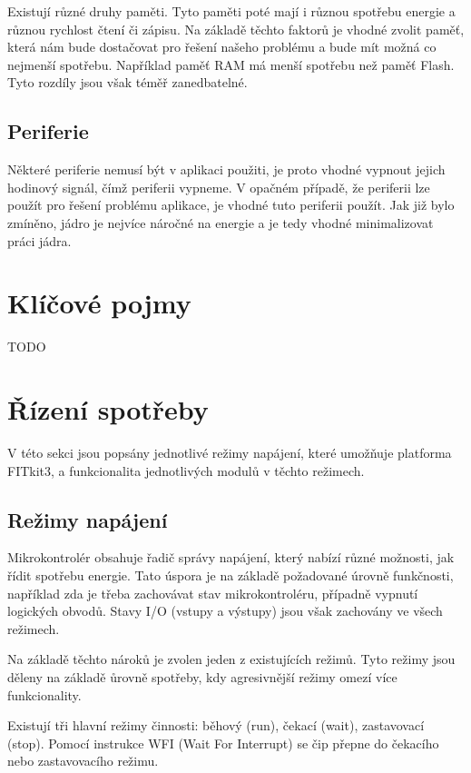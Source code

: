 \documentclass{article}
\begin{document}
Existují různé druhy paměti. Tyto paměti poté mají i různou spotřebu energie a
různou rychlost čtení či zápisu. Na základě těchto faktorů je vhodné zvolit
paměť, která nám bude dostačovat pro řešení našeho problému a bude mít možná co
nejmenší spotřebu. Například paměť RAM má menší spotřebu než paměť Flash. Tyto
rozdíly jsou však téměř zanedbatelné.

\subsection*{Periferie}

Některé periferie nemusí být v aplikaci použiti, je proto vhodné vypnout jejich
hodinový signál, čímž periferii vypneme. V opačném případě, že periferii lze
použít pro řešení problému aplikace, je vhodné tuto periferii použít. Jak již
bylo zmíněno, jádro je nejvíce náročné na energie a je tedy vhodné
minimalizovat práci jádra.

\section{Klíčové pojmy}

TODO

\section{Řízení spotřeby}

V této sekci jsou popsány jednotlivé režimy napájení, které umožňuje platforma
FITkit3, a funkcionalita jednotlivých modulů v těchto režimech.

\subsection{Režimy napájení}

Mikrokontrolér obsahuje řadič správy napájení, který nabízí různé možnosti, jak
řídit spotřebu energie. Tato úspora je na základě požadované úrovně funkčnosti,
například zda je třeba zachovávat stav mikrokontroléru, případně vypnutí
logických obvodů. Stavy I/O (vstupy a výstupy) jsou však zachovány ve všech
režimech.

Na základě těchto nároků je zvolen jeden z existujících režimů. Tyto režimy
jsou děleny na základě ůrovně spotřeby, kdy agresivnější režimy omezí více
funkcionality.

Existují tři hlavní režimy činnosti: běhový (run), čekací (wait), zastavovací
(stop). Pomocí instrukce WFI (Wait For Interrupt) se čip přepne do čekacího
nebo zastavovacího režimu.
\end{document}
